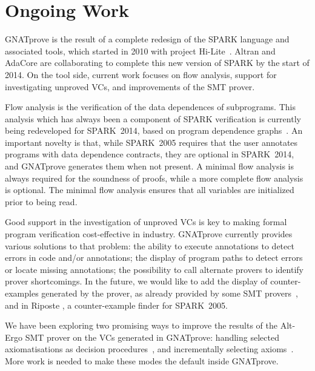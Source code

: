 \documentclass[sttt,final]{svjour}
\newcommand{\hilite}{Hi-Lite}
\newcommand{\gnatprove}{GNATprove\xspace}
\newcommand{\oldspark}{SPARK~2005\xspace}
\newcommand{\newspark}{SPARK~2014\xspace}
\begin{document}


\section{Ongoing Work}
\label{ongoing}

\gnatprove is the result of a complete redesign of the SPARK language and
associated tools, which started in 2010 with project \hilite\ \cite{Hi-Lite}.
Altran and AdaCore are collaborating to complete this new version of SPARK by
the start of 2014. On the tool side, current work focuses on flow analysis,
support for investigating unproved VCs, and improvements of the SMT prover.

Flow analysis is the verification of the data dependences of
subprograms. This analysis which has always been a component of SPARK
verification is currently being redeveloped for \newspark, based on
program dependence graphs~\cite{horwitz:1988:pldi}. An important
novelty is that, while \oldspark requires that the user annotates
programs with data dependence contracts, they are optional in
\newspark, and \gnatprove generates them when not present. A minimal
flow analysis is always required for the soundness of proofs, while a
more complete flow analysis is optional. The minimal flow analysis
ensures that all variables are initialized prior to being read.

Good support in the investigation of unproved VCs is key to making
formal program verification cost-effective in industry. \gnatprove
currently provides various solutions to that problem: the ability to
execute annotations to detect errors in code and/or annotations; the
display of program paths to detect errors or locate missing
annotations; the possibility to call alternate provers to identify
prover shortcomings. In the future, we would like to add the display
of counter-examples generated by the prover, as already provided by
some SMT provers~\cite{CVC3,Z3model}, and in Riposte
\cite{riposteICLP}, a counter-example finder for \oldspark.

We have been exploring two promising ways to improve the results of the
Alt-Ergo SMT prover on the VCs generated in \gnatprove: handling selected
axiomatisations as decision procedures~\cite{dross:2012:smt}, and incrementally
selecting axioms~\cite{cgs09:ipo,kuhlwein:2012:ijcar}. More work is needed to
make these modes the default inside \gnatprove.



%


\end{document}
